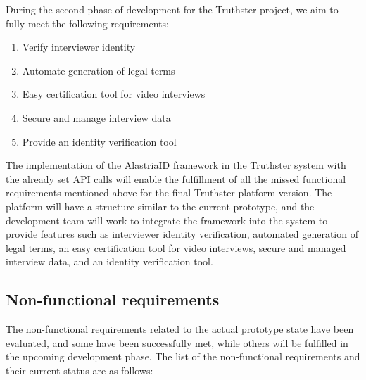 \documentclass[target=mst,aauheader=]{thud}
\begin{document}
    During the second phase of development for the Truthster project, we aim to fully meet the following requirements:

    \begin{enumerate}

        \item Verify interviewer identity
        \item Automate generation of legal terms
        \item Easy certification tool for video interviews
        \item Secure and manage interview data
        \item Provide an identity verification tool

    \end{enumerate}

The implementation of the AlastriaID framework in the Truthster system with the already set API calls will enable the fulfillment of all the missed functional requirements mentioned above for the final Truthster platform version. The platform will have a structure similar to the current prototype, and the development team will work to integrate the framework into the system to provide features such as interviewer identity verification, automated generation of legal terms, an easy certification tool for video interviews, secure and managed interview data, and an identity verification tool.\par

\subsection{Non-functional requirements}

The non-functional requirements related to the actual prototype state have been evaluated, and some have been successfully met, while others will be fulfilled in the upcoming development phase. The list of the non-functional requirements and their current status are as follows:
\end{document}
